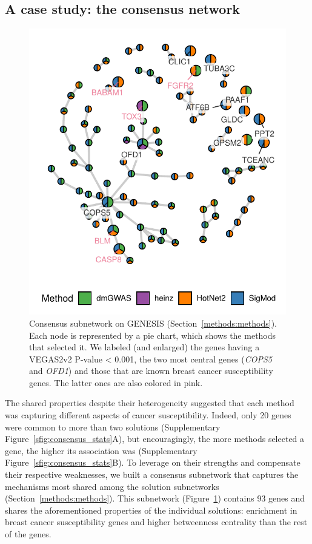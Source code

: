 \documentclass[twocolumn, 11pt]{article}
\begin{document}
\subsection{A case study: the consensus network}
\label{results:consensus}
\begin{figure}[htbp]
  \centering
  \includegraphics[width=.5\linewidth]{./figures/figure_3.pdf}
  \caption{\label{fig:consensus}
    Consensus subnetwork on GENESIS (Section~\ref{methods:methods}). Each node is represented by a pie chart, which shows the methods that selected it. We labeled (and enlarged) the genes having a VEGAS2v2 P-value < 0.001, the two most central genes (\emph{COPS5} and \emph{OFD1}) and those that are known breast cancer susceptibility genes. The latter ones are also colored in pink.}
\end{figure}

The shared properties despite their heterogeneity suggested that each method was capturing different aspects of cancer susceptibility. Indeed, only 20 genes were common to more than two solutions (Supplementary Figure~\ref{sfig:consensus_stats}A), but encouragingly, the more methods selected a gene, the higher its association was (Supplementary Figure~\ref{sfig:consensus_stats}B). To leverage on their strengths and compensate their respective weaknesses, we built a consensus subnetwork that captures the mechanisms most shared among the solution subnetworks (Section~\ref{methods:methods}). This subnetwork (Figure~\ref{fig:consensus}) contains 93 genes and shares the aforementioned properties of the individual solutions: enrichment in breast cancer susceptibility genes and higher betweenness centrality than the rest of the genes. 
\end{document}

